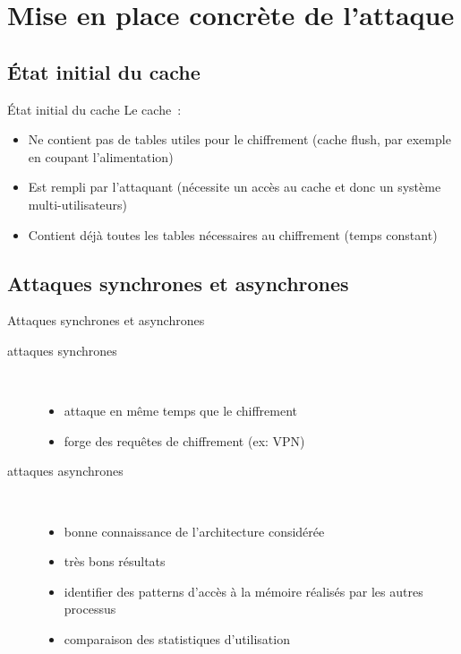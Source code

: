 \documentclass[11pt]{beamer}
\begin{document}
\section{Mise en place concrète de l'attaque}

\subsection{État initial du cache}
\begin{frame}{État initial du cache}
Le cache~\cite{canteaut2006understanding}:
\begin{itemize}
\item Ne contient pas de tables utiles pour le chiffrement (cache flush, par exemple en coupant l'alimentation)
\item Est rempli par l'attaquant (nécessite un accès au cache et donc un système multi-utilisateurs) 
\item Contient déjà toutes les tables nécessaires au chiffrement (temps constant)
\end{itemize}
\end{frame}

\subsection{Attaques synchrones et asynchrones}
\begin{frame}{Attaques synchrones et asynchrones~\cite{osvik2006cache}}


\begin{description}
\item [attaques synchrones]~\\ 
\begin{itemize}
\item attaque en même temps que le chiffrement
\item forge des requêtes de chiffrement (ex: VPN)
\end{itemize}
\item [attaques asynchrones] ~\\
\begin{itemize}
\item bonne connaissance de l'architecture considérée
\item très bons résultats
\item identifier des patterns d'accès à la mémoire réalisés par les autres processus
\item comparaison des statistiques d'utilisation
\end{itemize}
\end{description}

\end{frame}
\end{document}
